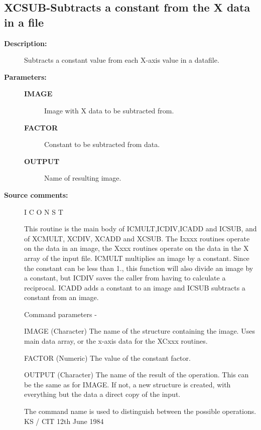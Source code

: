 \subsection{XCSUB-\label{XCSUB}Subtracts a constant from the X data in a file}
\begin{description}

\item [\textbf{Description:}]
 Subtracts a constant value from each X-axis value in a datafile.

\item [\textbf{Parameters:}]
\begin{description}
\item [\textbf{IMAGE}]
 Image with X data to be subtracted from.
\item [\textbf{FACTOR}]
 Constant to be subtracted from data.
\item [\textbf{OUTPUT}]
 Name of resulting image.
\end{description}

\item [\textbf{Source comments:}]
\begin{terminalv}
 I C O N S T

 This routine is the main body of ICMULT,ICDIV,ICADD and ICSUB,
 and of XCMULT, XCDIV, XCADD and XCSUB.  The Ixxxx routines
 operate on the data in an image, the Xxxx routines operate on
 the data in the X array of the input file.
 ICMULT multiplies an image by a constant.  Since the constant
 can be less than 1., this function will also divide an
 image by a constant, but ICDIV saves the caller from having
 to calculate a reciprocal. ICADD adds a constant to an image and
 ICSUB subtracts a constant from an image.

 Command parameters -

 IMAGE  (Character) The name of the structure containing the image.
        Uses main data array, or the x-axis data for the XCxxx routines.

 FACTOR (Numeric) The value of the constant factor.

 OUTPUT (Character) The name of the result of the operation.  This
        can be the same as for IMAGE.  If not, a new structure
        is created, with everything but the data a direct
        copy of the input.

 The command name is used to distinguish between the
 possible operations.
                                  KS / CIT 12th June 1984
\end{terminalv}
\end{description}
